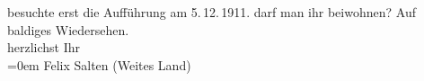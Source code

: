 \begin{ledgroupsized}[t]{13cm}
{{{                  besuchte erst die Aufführung am 5. 12. 1911.}}}\label{K_L02949-2h} darf man ihr beiwohnen? \pend
           \pstart
           Auf baldiges Wiedersehen.{\\[\baselineskip]} herzlichst Ihr{\\[\baselineskip]}\pend
           \leftskip=0em{}{\bigskip}\pstart
           \noindent{}Felix Salten\pend
           \pstart
           (Weites Land)\pend
           
         
         \endnumbering{}\end{ledgroupsized}\begin{anhang}\end{anhang}\newcommand{\dateiname}{L02949}\newcommand{\titel}{Arthur Schnitzler an Felix Salten, 20. 10. 1911}\newcommand{\editorInnen}{Martin Anton Müller und Laura Untner}
      